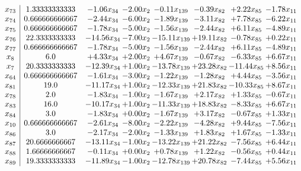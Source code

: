 \documentclass[8pt]{article}
\begin{document}
\[\begin{array}{c| c c@{\hskip 2pt} c@{\hskip 2pt} c@{\hskip 2pt} c@{\hskip 2pt} c@{\hskip 2pt} c@{\hskip 2pt} }
 x_{73}   &  1.33333333333 & -1.06 x_{34} & -2.00 x_{2} & -0.11 x_{139} & -0.39 x_{82} & +  2.22 x_{85} & -1.78 x_{11}\\
 x_{74}   &  0.666666666667 & -2.44 x_{34} & -6.00 x_{2} & -1.89 x_{139} & -3.11 x_{82} & +  7.78 x_{85} & -6.22 x_{11}\\
 x_{75}   &  0.666666666667 & -1.78 x_{34} & -5.00 x_{2} & -1.56 x_{139} & -2.44 x_{82} & +  6.11 x_{85} & -4.89 x_{11}\\
 x_{76}   &  22.3333333333 & -14.56 x_{34} & -7.00 x_{2} & -15.11 x_{139} & + 19.11 x_{82} & -0.78 x_{85} & +  0.22 x_{11}\\
 x_{77}   &  0.666666666667 & -1.78 x_{34} & -5.00 x_{2} & -1.56 x_{139} & -2.44 x_{82} & +  6.11 x_{85} & -4.89 x_{11}\\
 x_{8}   &  6.0 & +  4.33 x_{34} & +  2.00 x_{2} & +  4.67 x_{139} & -0.67 x_{82} & -6.33 x_{85} & +  6.67 x_{11}\\
 x_{7}   &  20.3333333333 & -12.39 x_{34} & +  1.00 x_{2} & -13.78 x_{139} & + 23.28 x_{82} & -11.44 x_{85} & +  8.56 x_{11}\\
 x_{64}   &  0.666666666667 & -1.61 x_{34} & -3.00 x_{2} & -1.22 x_{139} & -1.28 x_{82} & +  4.44 x_{85} & -3.56 x_{11}\\
 x_{81}   &  19.0 & -11.17 x_{34} & +  1.00 x_{2} & -12.33 x_{139} & + 21.83 x_{82} & -10.33 x_{85} & +  8.67 x_{11}\\
 x_{78}   &  2.0 & -1.83 x_{34} & -1.00 x_{2} & -1.67 x_{139} & +  2.17 x_{82} & +  1.33 x_{85} & -0.67 x_{11}\\
 x_{83}   &  16.0 & -10.17 x_{34} & +  1.00 x_{2} & -11.33 x_{139} & + 18.83 x_{82} & -8.33 x_{85} & +  6.67 x_{11}\\
 x_{84}   &  3.0 & -1.83 x_{34} & +  0.00 x_{2} & -1.67 x_{139} & +  3.17 x_{82} & -0.67 x_{85} & +  1.33 x_{11}\\
 x_{10}   &  0.666666666667 & -2.61 x_{34} & -8.00 x_{2} & -2.22 x_{139} & -4.28 x_{82} & +  9.44 x_{85} & -7.56 x_{11}\\
 x_{86}   &  3.0 & -2.17 x_{34} & -2.00 x_{2} & -1.33 x_{139} & +  1.83 x_{82} & +  1.67 x_{85} & -1.33 x_{11}\\
 x_{87}   &  20.6666666667 & -13.11 x_{34} & -1.00 x_{2} & -13.22 x_{139} & + 21.22 x_{82} & -7.56 x_{85} & +  6.44 x_{11}\\
 x_{88}   &  1.66666666667 & -0.11 x_{34} & +  0.00 x_{2} & +  0.78 x_{139} & +  1.22 x_{82} & -0.56 x_{85} & +  0.44 x_{11}\\
 x_{89}   &  19.3333333333 & -11.89 x_{34} & -1.00 x_{2} & -12.78 x_{139} & + 20.78 x_{82} & -7.44 x_{85} & +  5.56 x_{11}\\

\end{array}\]
\end{document}
